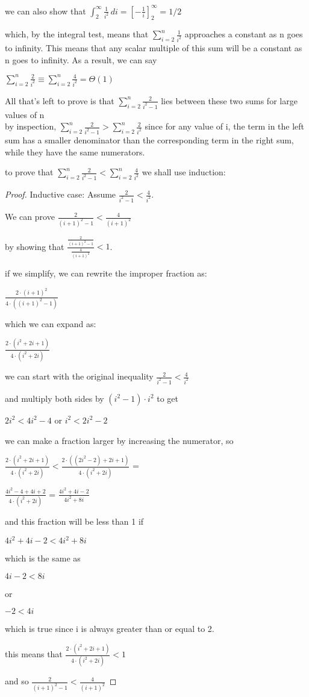 \documentclass[11pt,fleqn]{article}
\theoremstyle{definition}
\theoremstyle{remark}
\begin{document}
we can also show that 
$\int_{2}^{\infty} \frac{1}{i^2} \, di = \left[ -\frac{1}{i} \right]_{2}^{\infty} = 1/2$ 

which, by the integral test, means that $\sum_{i=2}^{n} \frac{1}{i^2}$ approaches
a constant as n goes to infinity. This means that any scalar multiple of 
this sum will be a constant as n goes to infinity. As a result, we can say

$\sum_{i=2}^{n} \frac{2}{i^2} \equiv \sum_{i=2}^{n} \frac{4}{i^2} = \Theta(1)$

All that's left 
to prove is that $\sum_{i=2}^{n} \frac{2}{i^2 - 1}$ lies between these
two sums for large values of n\\

by inspection, $\sum_{i=2}^{n} \frac{2}{i^2 - 1} > \sum_{i=2}^{n} \frac{2}{i^2}$
since for any value of i, the term in the left sum has a smaller denominator
than the corresponding term in the right sum, while they have the same numerators.

to prove that $\sum_{i=2}^{n} \frac{2}{i^2 - 1} < \sum_{i=2}^{n} \frac{4}{i^2}$
we shall use induction:

\begin{proof}
Inductive case:
Assume $\frac{2}{i^2 - 1} < \frac{4}{i^2}$.

We can prove $\frac{2}{{(i+1)}^2 - 1} < \frac{4}{{(i+1)}^2}$

by showing that $\frac{\frac{2}{{(i+1)}^2 - 1}}{\frac{4}{{(i+1)}^2}} < 1$.

if we simplify, we can rewrite the improper fraction as:

$\frac{2 \cdot {(i+1)}^2}{4 \cdot {({(i+1)}^2 - 1)}}$

which we can expand as:

$\frac{2 \cdot {(i^2 + 2i + 1)}}{4 \cdot {(i^2 + 2i)}}$

we can start with the original inequality $\frac{2}{i^2 - 1} < \frac{4}{i^2}$

and multiply both sides by ${({i}^2 -1)} \cdot {{i}^2}$ to get 

$2i^2 < 4i^2 - 4$ or $i^2 < 2i^2 - 2$

we can make a fraction larger by increasing the numerator, so

$\frac{2 \cdot {(i^2 + 2i + 1)}}{4 \cdot {(i^2 + 2i)}} < \frac{2 \cdot {((2i^2 - 2) + 2i + 1)}}{4 \cdot {(i^2 + 2i)}}$ = 

$\frac{4i^2 - 4 + 4i + 2}{4 \cdot {(i^2 + 2i)}}$ = $\frac{4i^2 + 4i - 2}{4i^2 + 8i}$

and this fraction will be less than 1 if 

${4i^2 + 4i - 2} < {4i^2 + 8i}$

which is the same as

${4i - 2} < {8i}$

or 

${-2} < {4i}$

which is true since i is always greater than or equal to 2.

this means that $\frac{2 \cdot {(i^2 + 2i + 1)}}{4 \cdot {(i^2 + 2i)}} < 1$

and so 
$\frac{2}{{(i+1)}^2 - 1} < \frac{4}{{(i+1)}^2}$

\end{proof}
\end{document}

